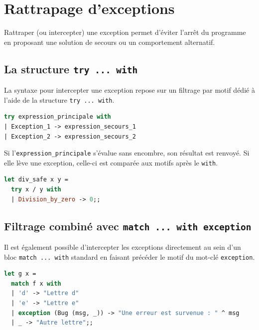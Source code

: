 \documentclass{article}
\begin{document}
\section{Rattrapage d'exceptions}

Rattraper (ou intercepter) une exception permet d'éviter l'arrêt du programme en proposant une solution de secours ou un comportement alternatif.

\subsection{La structure \texttt{try ... with}}

La syntaxe pour intercepter une exception repose sur un filtrage par motif dédié à l'aide de la structure \texttt{try ... with}.


\begin{lstlisting}[language=Caml]
try expression_principale with
| Exception_1 -> expression_secours_1
| Exception_2 -> expression_secours_2
\end{lstlisting}

\vspace{0.5em}
\noindent Si l'\texttt{expression\_principale} s'évalue sans encombre, son résultat est renvoyé. Si elle lève une exception, celle-ci est comparée aux motifs après le \texttt{with}.

\begin{lstlisting}[language=Caml]
let div_safe x y =
  try x / y with
  | Division_by_zero -> 0;;
\end{lstlisting}

\subsection{Filtrage combiné avec \texttt{match ... with exception}}

Il est également possible d'intercepter les exceptions directement au sein d'un bloc \texttt{match ... with} standard en faisant précéder le motif du mot-clé \texttt{exception}.

\begin{lstlisting}[language=Caml]
let g x = 
  match f x with
  | 'd' -> "Lettre d"
  | 'e' -> "Lettre e"
  | exception (Bug (msg, _)) -> "Une erreur est survenue : " ^ msg
  | _ -> "Autre lettre";;
\end{lstlisting}
\end{document}

